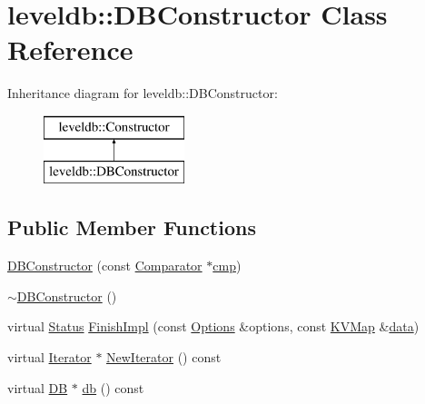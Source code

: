\hypertarget{classleveldb_1_1_d_b_constructor}{}\section{leveldb\+:\+:D\+B\+Constructor Class Reference}
\label{classleveldb_1_1_d_b_constructor}
Inheritance diagram for leveldb\+:\+:D\+B\+Constructor\+:\begin{figure}[H]
\begin{center}
\leavevmode
\includegraphics[height=2.000000cm]{classleveldb_1_1_d_b_constructor}
\end{center}
\end{figure}
\subsection*{Public Member Functions}
\begin{DoxyCompactItemize}
\item 
\hyperlink{classleveldb_1_1_d_b_constructor_ae27ecdd7732629b08c25a63f82dfd4a9}{D\+B\+Constructor} (const \hyperlink{structleveldb_1_1_comparator}{Comparator} $\ast$\hyperlink{table__test_8cc_a87863e435922f0910ca8db43f02a6c0b}{cmp})
\item 
\hyperlink{classleveldb_1_1_d_b_constructor_a370a9584eadd852b375267f69fde241c}{$\sim$\+D\+B\+Constructor} ()
\item 
virtual \hyperlink{classleveldb_1_1_status}{Status} \hyperlink{classleveldb_1_1_d_b_constructor_a554d8e348d9135ff72a43a03c647c261}{Finish\+Impl} (const \hyperlink{structleveldb_1_1_options}{Options} \&options, const \hyperlink{namespaceleveldb_aac1e50450147be263e08252c6700f7a7}{K\+V\+Map} \&\hyperlink{classleveldb_1_1_constructor_a55a0363200d6e86d8beb3b15b75e3824}{data})
\item 
virtual \hyperlink{classleveldb_1_1_iterator}{Iterator} $\ast$ \hyperlink{classleveldb_1_1_d_b_constructor_a51936c1c2cb31fe26f5fb2a237cfdeec}{New\+Iterator} () const 
\item 
virtual \hyperlink{classleveldb_1_1_d_b}{D\+B} $\ast$ \hyperlink{classleveldb_1_1_d_b_constructor_a2bec14f01bb0fc459e0a09a70f06210d}{db} () const 
\end{DoxyCompactItemize}


